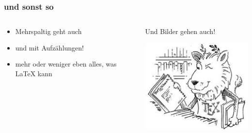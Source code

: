 \documentclass{beamer}
\begin{document}
\begin{frame}
  \frametitle{und sonst so}

  \onslide<+->

  \begin{columns}
    \begin{column}{0.45\linewidth}
      \begin{itemize}
      \item<+-> Mehrspaltig geht auch
      \item<+-> und mit Aufzählungen!
      \item<+-> mehr oder weniger eben alles, was \LaTeX{} kann
      \end{itemize}
    \end{column}

    \begin{column}{0.45\linewidth}
      \onslide<+->

      Und Bilder gehen auch!

      \begin{center}
        \includegraphics[width=\linewidth]{img/tex-lion.jpg}
      \end{center}

    \end{column}
  \end{columns}

\end{frame}
\end{document}
